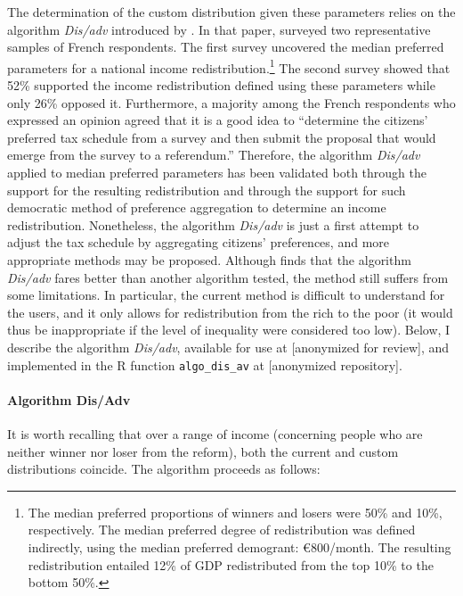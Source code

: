 The determination of the custom distribution given these parameters relies on the algorithm \textit{Dis/adv} introduced by \cite{fabre_french_2022}. In that paper, \cite{fabre_french_2022} surveyed two representative samples of French respondents. The first survey uncovered the median preferred parameters for a national income redistribution.\footnote{The median preferred proportions of winners and losers were 50\% and 10\%, respectively. The median preferred degree of redistribution was defined indirectly, using the median preferred demogrant: \euro{}800/month. The resulting redistribution entailed 12\% of GDP redistributed from the top 10\% to the bottom 50\%.} The second survey showed that 52\% supported the income redistribution defined using these parameters while only 26\% opposed it. Furthermore, a majority among the French respondents who expressed an opinion agreed that it is a good idea to ``determine the citizens' preferred tax schedule from a survey and then submit the proposal that would emerge from the survey to a referendum.'' Therefore, the algorithm \textit{Dis/adv} applied to median preferred parameters has been validated both through the support for the resulting redistribution and through the support for such democratic method of preference aggregation to determine an income redistribution. Nonetheless, the algorithm \textit{Dis/adv} is just a first attempt to adjust the tax schedule by aggregating citizens' preferences, and more appropriate methods may be proposed. Although \cite{fabre_french_2022} finds that the algorithm \textit{Dis/adv} fares better than another algorithm tested, the method still suffers from some limitations. In particular, the current method is difficult to understand for the users, and it only allows for redistribution from the rich to the poor (it would thus be inappropriate if the level of inequality were considered too low). Below, I describe the algorithm \textit{Dis/adv}, available for use at [anonymized for review], and implemented in the R function \verb|algo_dis_av| at [anonymized repository]. %

\paragraph{Algorithm Dis/Adv} 

It is worth recalling that over a range of income (concerning people who are neither winner nor loser from the reform), both the current and custom distributions coincide. The algorithm proceeds as follows:

